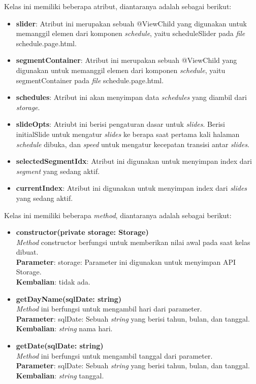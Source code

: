 \begin{enumerate}
			Kelas ini memiliki beberapa atribut, diantaranya adalah sebagai berikut:
			\begin{itemize} 
				\item \textbf{slider}: Atribut ini merupakan sebuah @ViewChild yang digunakan untuk memanggil elemen dari komponen \textit{schedule}, yaitu scheduleSlider pada \textit{file} schedule.page.html.
				\item \textbf{segmentContainer}: Atribut ini merupakan sebuah @ViewChild yang digunakan untuk memanggil elemen dari komponen \textit{schedule}, yaitu segmentContainer pada \textit{file} schedule.page.html.
				\item \textbf{schedules}: Atribut ini akan menyimpan data \textit{schedules} yang diambil dari \textit{storage}.
				\item \textbf{slideOpts}: Atriubt ini berisi pengaturan dasar untuk \textit{slides}. Berisi initialSlide untuk mengatur \textit{slides} ke berapa saat pertama kali halaman \textit{schedule} dibuka, dan \textit{speed} untuk mengatur kecepatan transisi antar \textit{slides}.
				\item \textbf{selectedSegmentIdx}: Atribut ini digunakan untuk menyimpan index dari \textit{segment} yang sedang aktif.
				\item \textbf{currentIndex}: Atribut ini digunakan untuk menyimpan index dari \textit{slides} yang sedang aktif.
			\end{itemize}
			Kelas ini memiliki beberapa \textit{method}, diantaranya adalah sebagai berikut:
			\begin{itemize}
				\item \textbf{constructor(private storage: Storage)}\\ 
					\textit{Method} constructor berfungsi untuk memberikan nilai awal pada saat kelas dibuat. \\
					\textbf{Parameter}: storage: Parameter ini digunakan untuk menyimpan API Storage.\\
					\textbf{Kembalian}: tidak ada.
					
				\item \textbf{getDayName(sqlDate: string)}\\
					\textit{Method} ini berfungsi untuk mengambil hari dari parameter. \\
					\textbf{Parameter}: sqlDate: Sebuah \textit{string} yang berisi tahun, bulan, dan tanggal.\\
					\textbf{Kembalian}: \textit{string} nama hari.
				
				\item \textbf{getDate(sqlDate: string)}\\
					\textit{Method} ini berfungsi untuk mengambil tanggal dari parameter. \\
					\textbf{Parameter}: sqlDate: Sebuah \textit{string} yang berisi tahun, bulan, dan tanggal. \\
					\textbf{Kembalian}: \textit{string} tanggal.
					

\end{itemize}
\end{enumerate}
